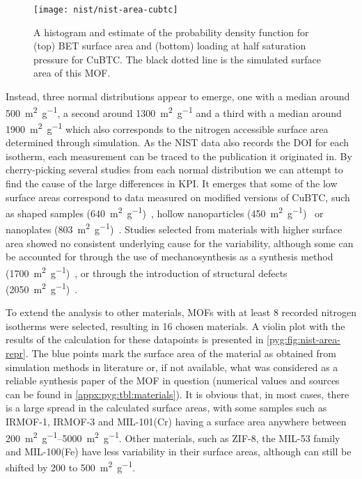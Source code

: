 \begin{figure}[htb]
	\centering
	\texttt{[image: nist/nist-area-cubtc]}%
	\caption{A histogram and estimate of the probability density
		function for (top) \gls{BET} surface area and (bottom) loading
		at half saturation pressure for CuBTC. The black dotted line
		is the simulated surface area of this \gls{MOF}.
	}\label{pyg:fig:nist-area-cubtc}
\end{figure}

Instead, three normal distributions appear to emerge, one with a
median around \SI{500}{\metre^2\per\gram}, a second around 
\SI{1300}{\metre^2\per\gram}
and a third with a median around \SI{1900}{\metre^2\per\gram} which also
corresponds to the nitrogen accessible surface area determined through
simulation. As the \gls{NIST} data also records the DOI for each isotherm, 
each measurement can be traced to the publication it originated in.
By cherry-picking several studies from each normal distribution
we can attempt to find the cause of the large differences in \gls{KPI}.
It emerges that some of the low surface areas correspond to data
measured on modified versions of CuBTC, such as shaped
samples (\SI{640}{\metre^2\per\gram})~\cite{liSeparationCO2CH42014}, 
hollow nanoparticles 
(\SI{450}{\metre^2\per\gram})~\cite{liControllableSynthesisMetal2013}
or nanoplates
(\SI{803}{\metre^2\per\gram})~\cite{pengSurfactantdirectedAssemblyMesoporous2012}.
Studies selected from materials with higher surface area
showed no consistent underlying cause for the variability,
although some can be accounted for through the use of
mechanosynthesis as a synthesis method
(\SI{1700}{\metre^2\per\gram})~\cite{klimakowMechanochemicalSynthesisMetal2010},
or through the introduction of structural defects 
(\SI{2050}{\metre^2\per\gram})~\cite{barinDefectCreationLinker2014}.

To extend the analysis to other materials, \glspl{MOF} with
at least 8 recorded nitrogen isotherms were selected, resulting in
16 chosen materials. A violin plot with the results of the calculation for
these datapoints is presented in \autoref{pyg:fig:nist-area-repr}.
The blue points mark the surface area of the material as
obtained from simulation methods in literature or, if not available,
what was considered as a reliable synthesis paper of the \gls{MOF} 
in question (numerical values and sources can be found in 
\autoref{appx:pyg:tbl:materials}).
It is obvious that, in most cases, there is a large spread in
the calculated surface areas, with some samples such as IRMOF-1,
IRMOF-3 and MIL-101(Cr) having a surface area anywhere
between \SIrange{200}{5000}{\metre^2\per\gram}. Other materials,
such as ZIF-8, the MIL-53 family
and MIL-100(Fe) have less variability in their surface areas,
although can still be shifted by 200 to \SI{500}{\metre^2\per\gram}.

